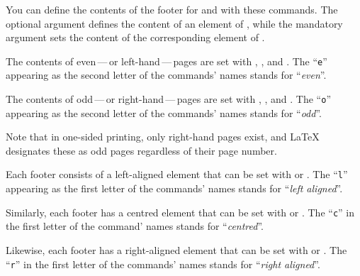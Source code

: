\begin{Declaration}
\end{Declaration}
You can define the contents of the footer for
 and
 with these commands. The
optional argument defines the content of an element of
, while the mandatory argument
sets the content of the corresponding element of
.

The contents of even\,---\,or left-hand\,---\,pages
are set with , , and . The
``\texttt{e}'' appearing as the second letter of the commands' names stands
for ``\emph{even}''.

The contents of odd\,---\,or right-hand\,---\,pages
are set with , , and . The
``\texttt{o}'' appearing as the second letter of the commands' names stands
for ``\emph{odd}''.

Note that in one-sided printing, only right-hand pages
exist, and \LaTeX{} designates these as odd pages regardless of their page
number.

Each footer consists of a left-aligned element that can
be set with  or . The ``\texttt{l}'' appearing as
the first letter of the commands' names stands for ``\emph{left aligned}''.

Similarly, each footer has a centred element that can be set
with  or . The ``\texttt{c}'' in the first letter
of the command' names stands for ``\emph{centred}''.

Likewise, each footer has a right-aligned element that
can be set with  or . The ``\texttt{r}'' in the
first letter of the commands' names stands for ``\emph{right aligned}''.

